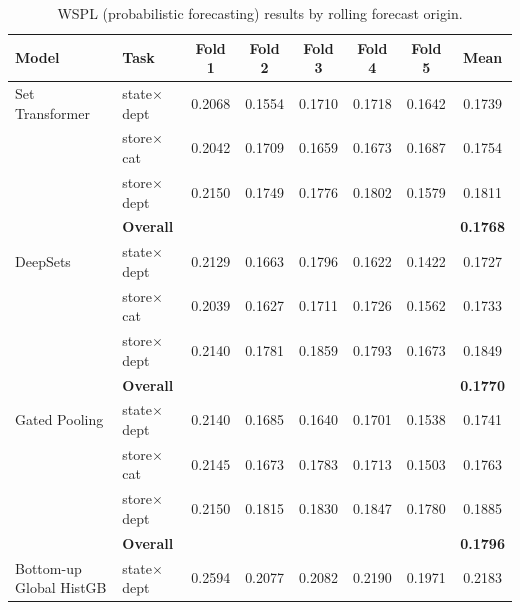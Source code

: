 \documentclass[12pt]{article}
\begin{document}
\begin{table}[H]
  \centering
  \caption{WSPL (probabilistic forecasting) results by rolling forecast origin.}
  \label{tab:appendix_rolling_folds_quantile}
  \begin{threeparttable}
    \footnotesize
    \begin{tabular}{llccccc|c}
      \toprule
      \textbf{Model} & \textbf{Task} & \textbf{Fold 1} & \textbf{Fold 2} & \textbf{Fold 3} & \textbf{Fold 4} & \textbf{Fold 5} & \textbf{Mean} \\
      \midrule
      Set Transformer              & state$\times$dept      &   0.2068 &   0.1554 &   0.1710 &   0.1718 &   0.1642 &   0.1739 \\
                                   & store$\times$cat       &   0.2042 &   0.1709 &   0.1659 &   0.1673 &   0.1687 &   0.1754 \\
                                   & store$\times$dept      &   0.2150 &   0.1749 &   0.1776 &   0.1802 &   0.1579 &   0.1811 \\
                                   & {\bf Overall} & & & & & & {\bf 0.1768} \\
      \addlinespace
      DeepSets                     & state$\times$dept      &   0.2129 &   0.1663 &   0.1796 &   0.1622 &   0.1422 &   0.1727 \\
                                   & store$\times$cat       &   0.2039 &   0.1627 &   0.1711 &   0.1726 &   0.1562 &   0.1733 \\
                                   & store$\times$dept      &   0.2140 &   0.1781 &   0.1859 &   0.1793 &   0.1673 &   0.1849 \\
                                   & {\bf Overall} & & & & & & {\bf 0.1770} \\
      \addlinespace
      Gated Pooling                & state$\times$dept      &   0.2140 &   0.1685 &   0.1640 &   0.1701 &   0.1538 &   0.1741 \\
                                   & store$\times$cat       &   0.2145 &   0.1673 &   0.1783 &   0.1713 &   0.1503 &   0.1763 \\
                                   & store$\times$dept      &   0.2150 &   0.1815 &   0.1830 &   0.1847 &   0.1780 &   0.1885 \\
                                   & {\bf Overall} & & & & & & {\bf 0.1796} \\
      \addlinespace
      Bottom-up Global HistGB      & state$\times$dept      &   0.2594 &   0.2077 &   0.2082 &   0.2190 &   0.1971 &   0.2183 \\

\end{tabular}
\end{threeparttable}
\end{table}
\end{document}
